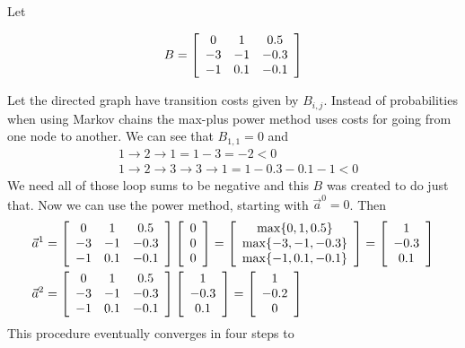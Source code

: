 \begin{example}
Let

\begin{equation*}
B = \left[\begin{array}{c c c} 0 & 1 & 0.5 \\ -3 & -1 & -0.3 \\ -1 & 0.1 & -0.1 \end{array}\right]
\end{equation*}

Let the directed graph have transition costs given by $B_{i,j}$.
Instead of probabilities when using Markov chains the max-plus power method uses costs for going from one node to another.%
We can see that $B_{1,1}=0$ and
\begin{align*}
&1\to2\to1 = 1-3 = -2<0 \\
&1\to2\to3\to3\to1 = 1-0.3-0.1-1 < 0
\end{align*}
We need all of those loop sums to be negative and this $B$ was created to do just that.
Now we can use the power method, starting with $\vec{a}^0=0$.
Then
\begin{align*}
\vec{a}^1 &= \left[\begin{array}{c c c} 0 & 1 & 0.5 \\ -3 & -1 & -0.3 \\ -1 & 0.1 & -0.1 \end{array}\right] \left[\begin{array}{c} 0 \\ 0 \\ 0 \end{array}\right] = \left[\begin{array}{c} \max\{0,1,0.5\} \\ \max\{-3,-1,-0.3\} \\ \max\{-1,0.1,-0.1\} \end{array}\right] = \left[\begin{array}{c} 1 \\ -0.3 \\ 0.1 \end{array}\right] \\
\vec{a}^2 &= \left[\begin{array}{c c c} 0 & 1 & 0.5 \\ -3 & -1 & -0.3 \\ -1 & 0.1 & -0.1 \end{array}\right] \left[\begin{array}{c} 1 \\ -0.3 \\ 0.1 \end{array}\right] = \left[\begin{array}{c} 1 \\ -0.2 \\ 0 \end{array}\right]
\end{align*}
This procedure eventually converges in four steps to


\end{example}
